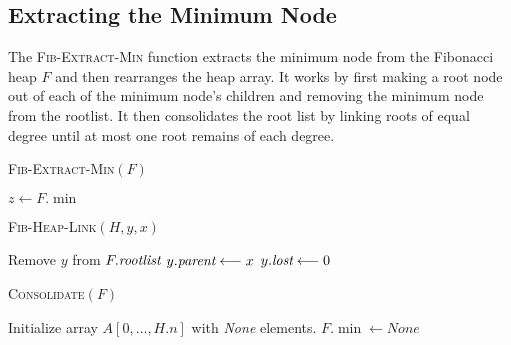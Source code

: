 \subsection{Extracting the Minimum Node}
The \textsc{Fib-Extract-Min} function extracts the minimum node from the Fibonacci heap $F$ and then rearranges the heap array. It works by first making a root node out of each of the minimum node's children and removing the minimum node from the rootlist. It then consolidates the root list by linking roots of equal degree until at most one root remains of each degree.
\begin{center}
	\begin{minipage}{0.45\textwidth}
		\begin{algorithm}[H]
			\caption{\textsc{Fib-Extract-Min}$(F)$}
			\DontPrintSemicolon
			$z\longleftarrow F.\min$\;
		\end{algorithm}
		\vspace{3.6cm}

		\begin{algorithm}[H]
			\caption{\textsc{Fib-Heap-Link}$(H,y,x)$}
			\DontPrintSemicolon
			Remove $y$ from $F.\emph{rootlist}$\;
			$y.\emph{parent}\longleftarrow x$\;
			$y.\emph{lost}\longleftarrow 0$
		\end{algorithm}
	\end{minipage}\hfill
	\begin{minipage}{0.5\textwidth}
		\begin{algorithm}[H]
			\caption{\textsc{Consolidate}$(F)$}
			\DontPrintSemicolon
			Initialize array $A[0,\dots, H.n]$ with \emph{None} elements.\;
			$F.\min\longleftarrow None$\;
		\end{algorithm}
	\end{minipage}
\end{center}

